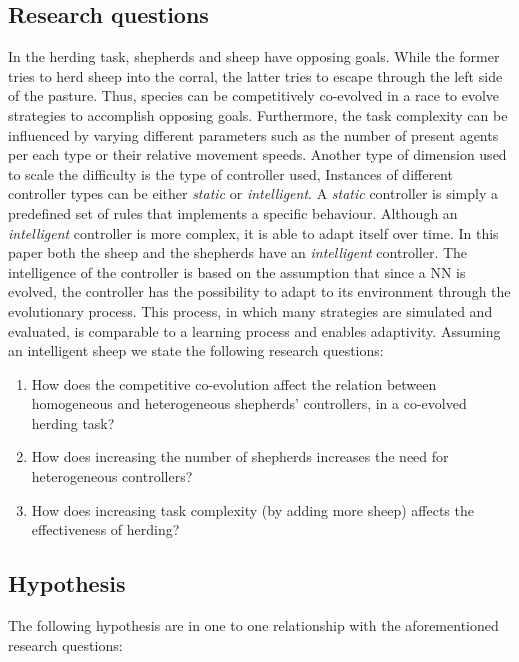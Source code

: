 \documentclass[conference]{IEEEtran}
\begin{document}
\subsection{Research questions}
\label{sec:researchQuestions}
In the herding task, shepherds and sheep have opposing goals.
While the former tries to herd sheep into the corral, the latter tries to escape through the left side of the pasture. 
Thus, species can be competitively co-evolved in a race to evolve strategies to accomplish opposing goals. 
Furthermore, the task complexity can be influenced by varying different parameters such as the number of present agents per each type or their relative movement speeds. 
Another type of dimension used to scale the difficulty is the type of controller used,
Instances of different controller types can be either \textit{static} or \textit{intelligent}.
A \textit{static} controller is simply a predefined set of rules that implements a specific behaviour.
Although an \textit{intelligent} controller is more complex, it is able to  adapt itself over time.
In this paper both the sheep and the shepherds have an \textit{intelligent} controller.
The intelligence of the controller is based on the assumption that since a NN is evolved, the controller has the possibility to adapt to its environment through the evolutionary process. 
This process, in which many strategies are simulated and evaluated, is comparable to a learning process and enables adaptivity. 
Assuming an intelligent sheep we state the following research questions:
 
\begin{enumerate}
	\item How does the competitive co-evolution affect the relation between homogeneous and heterogeneous shepherds' controllers, in a co-evolved herding task?
	\item How does increasing the number of shepherds increases the need for heterogeneous controllers?
	\item How does increasing task complexity (by adding more sheep) affects the effectiveness of herding?
\end{enumerate}

\subsection{Hypothesis}
\label{sec:hypothesis}
The following hypothesis are in one to one relationship with the aforementioned research questions:
\end{document}
